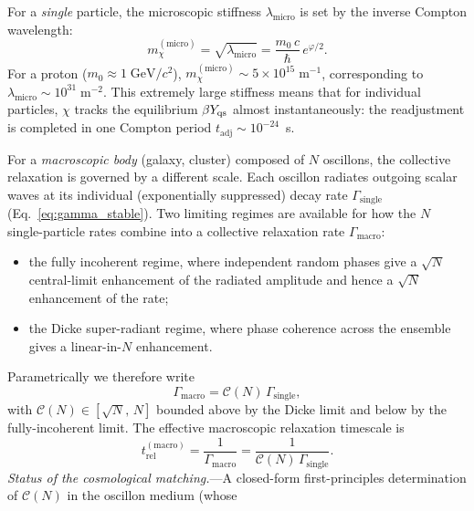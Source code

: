 \documentclass[aps,prd,onecolumn,superscriptaddress,nofootinbib,showpacs,12pt,notitlepage]{revtex4-2}
\begin{document}
For a \emph{single} particle, the microscopic stiffness
$\lambda_{\mathrm{micro}}$ is set by the inverse Compton
wavelength:
\begin{equation}\label{eq:lambda_micro}
  m_{\chi}^{(\mathrm{micro})}
  = \sqrt{\lambda_{\mathrm{micro}}}
  = \frac{m_{0}\,c}{\hbar}\,e^{\varphi/2}.
\end{equation}
For a proton ($m_{0} \approx 1\;\mathrm{GeV}/c^{2}$),
$m_{\chi}^{(\mathrm{micro})} \sim 5 \times 10^{15}\;\mathrm{m}^{-1}$,
corresponding to
$\lambda_{\mathrm{micro}} \sim 10^{31}\;\mathrm{m}^{-2}$.
This extremely large stiffness means that for individual
particles, $\chi$ tracks the equilibrium $\beta Y_{\rm qs}$
almost instantaneously: the readjustment is completed in
one Compton period $t_{\mathrm{adj}} \sim 10^{-24}$~s.

For a \emph{macroscopic body} (galaxy, cluster) composed
of $N$ oscillons, the collective relaxation is governed
by a different scale.  Each oscillon radiates outgoing
scalar waves at its individual (exponentially suppressed)
decay rate $\Gamma_{\mathrm{single}}$
(Eq.~\ref{eq:gamma_stable}).  Two limiting regimes are
available for how the $N$ single-particle rates combine
into a collective relaxation rate
$\Gamma_{\mathrm{macro}}$:
\begin{itemize}
  \item the fully incoherent regime, where independent
    random phases give a $\sqrt{N}$ central-limit
    enhancement of the radiated amplitude and hence a
    $\sqrt{N}$ enhancement of the rate;
  \item the Dicke super-radiant regime, where phase
    coherence across the ensemble gives a linear-in-$N$
    enhancement.
\end{itemize}
Parametrically we therefore write
\begin{equation}\label{eq:gamma_collective}
  \Gamma_{\mathrm{macro}}
  = \mathcal{C}(N)\,\Gamma_{\mathrm{single}},
\end{equation}
with $\mathcal{C}(N) \in [\sqrt{N},\,N]$ bounded above
by the Dicke limit and below by the fully-incoherent
limit.  The effective macroscopic relaxation timescale
is
\begin{equation}\label{eq:t_macro}
  t_{\mathrm{rel}}^{(\mathrm{macro})}
  = \frac{1}{\Gamma_{\mathrm{macro}}}
  = \frac{1}{\mathcal{C}(N)\,\Gamma_{\mathrm{single}}}.
\end{equation}
\textit{Status of the cosmological matching.}---A
closed-form first-principles determination of
$\mathcal{C}(N)$ in the oscillon medium (whose
\end{document}

